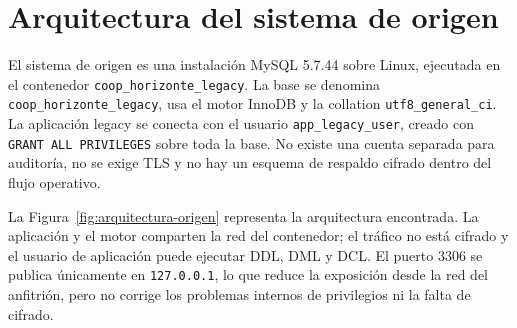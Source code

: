 
\section{Arquitectura del sistema de origen}

El sistema de origen es una instalación MySQL 5.7.44 sobre Linux, ejecutada
en el contenedor \texttt{coop\_horizonte\_legacy}. La base se denomina
\texttt{coop\_horizonte\_legacy}, usa el motor InnoDB y la collation
\texttt{utf8\_general\_ci}. La aplicación legacy se conecta con el usuario
\texttt{app\_legacy\_user}, creado con \texttt{GRANT ALL PRIVILEGES} sobre
toda la base. No existe una cuenta separada para auditoría, no se exige TLS
y no hay un esquema de respaldo cifrado dentro del flujo operativo.

La Figura~\ref{fig:arquitectura-origen} representa la arquitectura
encontrada. La aplicación y el motor comparten la red del contenedor; el
tráfico no está cifrado y el usuario de aplicación puede ejecutar DDL, DML y
DCL. El puerto 3306 se publica únicamente en \texttt{127.0.0.1}, lo que
reduce la exposición desde la red del anfitrión, pero no corrige los
problemas internos de privilegios ni la falta de cifrado.



